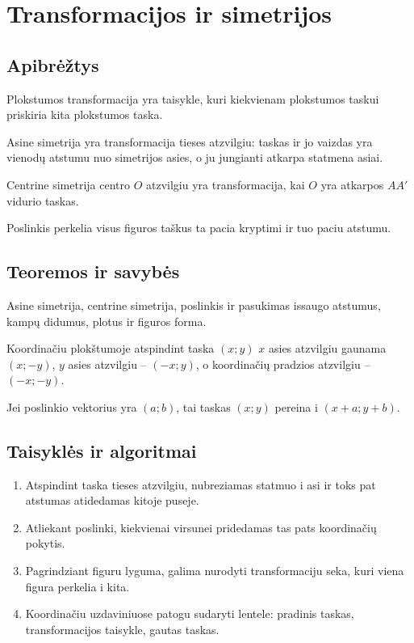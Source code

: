 \section{Transformacijos ir simetrijos}\label{sec:transformacijos-ir-simetrijos}

\subsection{Apibrėžtys}
\begin{apibreztis}
Plokstumos transformacija yra taisykle, kuri kiekvienam plokstumos taskui priskiria kita plokstumos taska.
\end{apibreztis}
\begin{apibreztis}
Asine simetrija yra transformacija tieses atzvilgiu: taskas ir jo vaizdas yra vienodų atstumu nuo simetrijos asies, o ju jungianti atkarpa statmena asiai.
\end{apibreztis}
\begin{apibreztis}
Centrine simetrija centro $O$ atzvilgiu yra transformacija, kai $O$ yra atkarpos $AA'$ vidurio taskas.
\end{apibreztis}
\begin{apibreztis}
Poslinkis perkelia visus figuros taškus ta pacia kryptimi ir tuo paciu atstumu.
\end{apibreztis}

\subsection{Teoremos ir savybės}
\begin{savybe}
Asine simetrija, centrine simetrija, poslinkis ir pasukimas issaugo atstumus, kampų didumus, plotus ir figuros forma.
\end{savybe}
\begin{savybe}
Koordinačiu plokštumoje atspindint taska $(x;y)$ $x$ asies atzvilgiu gaunama $(x;-y)$, $y$ asies atzvilgiu -- $(-x;y)$, o koordinačių pradzios atzvilgiu -- $(-x;-y)$.
\end{savybe}
\begin{savybe}
Jei poslinkio vektorius yra $(a;b)$, tai taskas $(x;y)$ pereina i $(x+a;y+b)$.
\end{savybe}

\subsection{Taisyklės ir algoritmai}
\begin{enumerate}[label=\arabic*.]
\item Atspindint taska tieses atzvilgiu, nubreziamas statmuo i asi ir toks pat atstumas atidedamas kitoje puseje.
\item Atliekant poslinki, kiekvienai virsunei pridedamas tas pats koordinačių pokytis.
\item Pagrindziant figuru lyguma, galima nurodyti transformaciju seka, kuri viena figura perkelia i kita.
\item Koordinačiu uzdaviniuose patogu sudaryti lentele: pradinis taskas, transformacijos taisykle, gautas taskas.
\end{enumerate}
